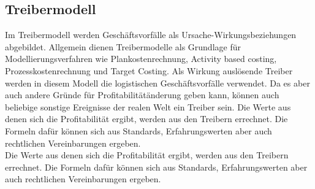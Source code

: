 \subsection{Treibermodell}
Im Treibermodell werden Geschäftsvorfälle als Ursache-Wirkungsbeziehungen abgebildet.
Allgemein dienen Treibermodelle als Grundlage für Modellierungsverfahren wie Plankostenrechnung, Activity based costing, Prozesskostenrechnung und Target Costing. \cite{ICV-Ideenwerkstatt:2016} Als Wirkung auslösende Treiber werden in diesem Modell die logistischen Geschäftsvorfälle verwendet. Da es aber auch andere Gründe für Profitabilitätänderung geben kann, können auch beliebige sonstige Ereignisse der realen Welt ein Treiber sein.
Die Werte aus denen sich die Profitabilität ergibt, werden aus den Treibern errechnet. Die Formeln dafür können sich aus Standards, Erfahrungswerten aber auch rechtlichen Vereinbarungen ergeben.
\\
Die Werte aus denen sich die Profitabilität ergibt, werden aus den Treibern errechnet. Die Formeln dafür können sich aus Standards, Erfahrungswerten aber auch rechtlichen Vereinbarungen ergeben. 


